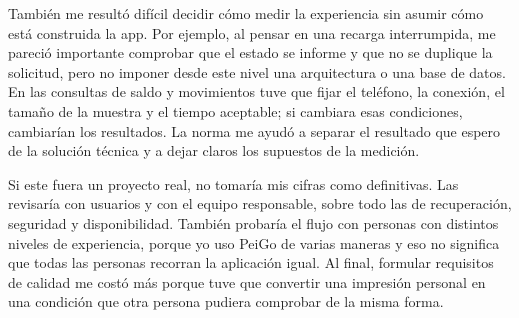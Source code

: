 \documentclass[10pt,letterpaper]{article}
\begin{document}
También me resultó difícil decidir cómo medir la experiencia sin asumir cómo está construida la app. Por ejemplo, al pensar en una recarga interrumpida, me pareció importante comprobar que el estado se informe y que no se duplique la solicitud, pero no imponer desde este nivel una arquitectura o una base de datos. En las consultas de saldo y movimientos tuve que fijar el teléfono, la conexión, el tamaño de la muestra y el tiempo aceptable; si cambiara esas condiciones, cambiarían los resultados. La norma me ayudó a separar el resultado que espero de la solución técnica y a dejar claros los supuestos de la medición.

Si este fuera un proyecto real, no tomaría mis cifras como definitivas. Las revisaría con usuarios y con el equipo responsable, sobre todo las de recuperación, seguridad y disponibilidad. También probaría el flujo con personas con distintos niveles de experiencia, porque yo uso PeiGo de varias maneras y eso no significa que todas las personas recorran la aplicación igual. Al final, formular requisitos de calidad me costó más porque tuve que convertir una impresión personal en una condición que otra persona pudiera comprobar de la misma forma.

\clearpage


\end{document}
